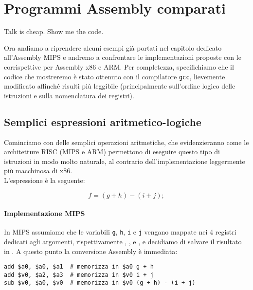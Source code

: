 \documentclass[class=book, crop=false, oneside]{standalone}
\begin{document}
\chapter{Programmi Assembly comparati}\label{ch:asm}
\begin{fquote}Talk is cheap. Show me the code.\end{fquote}
Ora andiamo a riprendere alcuni esempi già portati nel capitolo dedicato all'Assembly MIPS e andremo a confrontare le implementazioni proposte con le corrispettive per Assembly x86 e ARM.
Per completezza, specifichiamo che il codice che mostreremo è stato ottenuto con il compilatore \texttt{gcc}, lievemente modificato affinché risulti più leggibile (principalmente sull'ordine logico delle istruzioni e sulla nomenclatura dei registri).

\section{Semplici espressioni aritmetico-logiche}
Cominciamo con delle semplici operazioni aritmetiche, che evidenzieranno come le architetture RISC (MIPS e ARM) permettono di eseguire questo tipo di istruzioni in modo molto naturale, al contrario dell'implementazione leggermente più macchinosa di x86.\\
L'espressione è la seguente:

\begin{equation*}
	f = (g + h) - (i + j);
\end{equation*}

\subsubsection{Implementazione MIPS}
In MIPS assumiamo che le variabili \texttt{g}, \texttt{h}, \texttt{i} e \texttt{j} vengano mappate nei 4 registri dedicati agli argomenti, rispettivamente , ,  e , e decidiamo di salvare il risultato in . A questo punto la conversione Assembly è immediata:
\begin{verbatim}
add $a0, $a0, $a1  # memorizza in $a0 g + h
add $v0, $a2, $a3  # memorizza in $v0 i + j
sub $v0, $a0, $v0  # memorizza in $v0 (g + h) - (i + j)
\end{verbatim}
\end{document}
